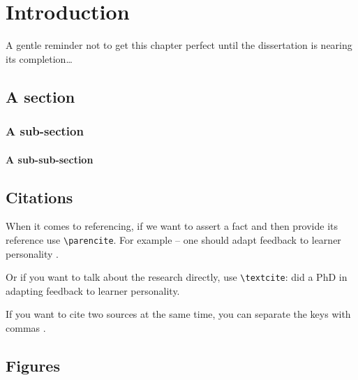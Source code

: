 \chapter{Introduction} \label{chap:intro}
A gentle reminder not to get this chapter perfect until the dissertation is nearing its completion\ldots

\section{A section}

\subsection{A sub-section}

\subsubsection{A sub-sub-section}



\section{Citations}

When it comes to referencing, if we want to assert a fact and then provide its reference use \verb!\parencite!. For example -- one should adapt feedback to learner personality \parencite{zhong2019predicting}.

Or if you want to talk about the research directly, use \verb!\textcite!: \textcite{dennis2016adapting} did a PhD in adapting feedback to learner personality. 

If you want to cite two sources at the same time, you can separate the keys with commas \parencite{dennis2016adapting,cle12}.

\section{Figures}

